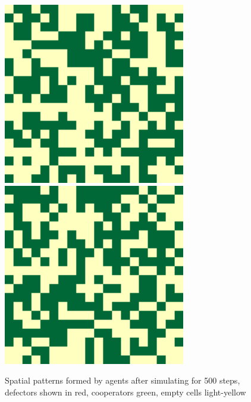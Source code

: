\documentclass[runningheads]{llncs}
\begin{document}
\begin{figure}[!hb]
{    \includegraphics[width=\textwidth/4]{spatial-memory1+gossip1+range3-B.pdf}
    \includegraphics[width=\textwidth/4]{spatial-memory1+gossip1+range3-C.pdf}
  }
  \caption{Spatial patterns formed by agents after simulating for 500 steps, defectors shown in red, cooperators green, empty cells light-yellow}
  \label{fig:spatial}
\end{figure}
\end{document}
